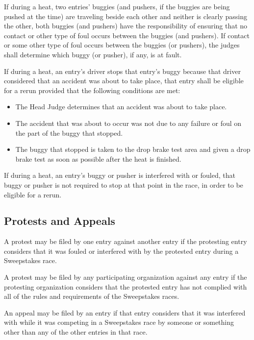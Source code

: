	If during a heat, two entries' buggies (and pushers, if the buggies are being
	pushed at the time) are traveling beside each other and neither is clearly
	passing the other, both buggies (and pushers) have the responsibility of
	ensuring that no contact or other type of foul occurs between the buggies (and
	pushers). If contact or some other type of foul occurs between the buggies (or
	pushers), the judges shall determine which buggy (or pusher), if any, is at
	fault.

	If during a heat, an entry's driver stops that entry's buggy because that
	driver considered that an accident was about to take place, that entry shall be
	eligible for a rerun provided that the following conditions are met:

		\begin{itemize}

			\item The Head Judge determines that an accident was about to take
			place.

			\item The accident that was about to occur was not due to any failure
			or foul on the part of the buggy that stopped.

			\item The buggy that stopped is taken to the drop brake test area and
			given a drop brake test as soon as possible after the heat is finished.

		\end{itemize}

	If during a heat, an entry's buggy or pusher is interfered with or fouled, that
	buggy or pusher is not required to stop at that point in the race, in order to
	be eligible for a rerun.

\subsection{Protests and Appeals}

	A protest may be filed by one entry against another entry if the protesting
	entry considers that it was fouled or interfered with by the protested entry
	during a Sweepstakes race.

	A protest may be filed by any participating organization against any entry if
	the protesting organization considers that the protested entry has not complied
	with all of the rules and requirements of the Sweepstakes races.

	An appeal may be filed by an entry if that entry considers that it was
	interfered with while it was competing in a Sweepstakes race by someone or
	something other than any of the other entries in that race.

